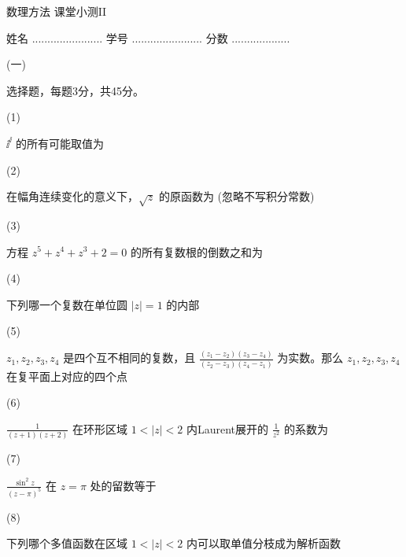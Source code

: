 \documentclass[12pt,CJK]{article}
\begin{document}
\bch
{\large 数理方法 课堂小测II}

{\vskip 0.25in}

姓名 ....................... {\hskip 0.5in}    学号 .......................{\hskip 0.5in}  分数 ...................

{\vskip 0.1in}

\bitem
\item[(一)]{选择题，每题3分，共45分。

  \bitem

\item[(1)]{ $\ii^\ii$ 的所有可能取值为 \bropt

}

\item[(2)]{在幅角连续变化的意义下，$\sqrt{z}$ 的原函数为 (忽略不写积分常数) \bropt

  }
  

\item[(3)]{方程 $z^5 + z^4  + z^3+ 2=0$ 的所有复数根的倒数之和为 \bropt

  }


\item[(4)]{下列哪一个复数在单位圆 $|z|=1$ 的内部 \bropt

   }
  
  
\item[(5)]{$z_1,z_2,z_3,z_4$ 是四个互不相同的复数，且 $\frac{(z_1-z_2)(z_3-z_4)}{(z_2-z_3)(z_4-z_1)}$ 为实数。那么 $z_1,z_2,z_3,z_4$ 在复平面上对应的四个点 \bropt

  }

\item[(6)]{ $\frac{1}{(z+1)(z+2)}$ 在环形区域 $1<|z|<2$ 内Laurent展开的 $\frac{1}{z^2}$ 的系数为 \bropt

    }
  
\item[(7)]{$\frac{\sin^2 z}{\left(z-\pi\right)^5}$ 在 $z=\pi$ 处的留数等于 \bropt

    }


\item[(8)]{下列哪个多值函数在区域 $1<|z|<2$ 内可以取单值分枝成为解析函数 \bropt

}}
\end{document}
